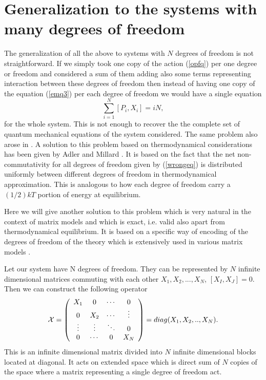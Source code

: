 \documentclass[a4paper,11pt]{article}
\begin{document}
\section{Generalization to the systems with many degrees of
freedom} \label{sec5}

 The generalization of all the above to systems
with $N$ degrees of freedom is not straightforward. If we simply
took one copy of the action (\ref{opfq}) per one degree or freedom
and considered a sum of them adding also some terms representing
interaction between these degrees of freedom then instead of
having one copy of the equation (\ref{emq3}) per each degree of
freedom we would have a single equation
\begin{equation}
\sum\limits_{i=1}^{N} [P_i,X_i]=iN, \label{wrongeq}
\end{equation}
for the whole system. This is not enough to recover the the
complete set of quantum mechanical equations of the system
considered. The same problem also arose in \cite{adlerbook}. A
solution to this problem based on thermodynamical considerations
has been given by Adler and Millard \cite{adlermillard}. It is
based on the fact that the net non-commutativity for all degrees
of freedom given by (\ref{wrongeq}) is distributed uniformly
between different degrees of freedom in thermodynamical
approximation. This is analogous to how each degree of freedom
carry a $(1/2)kT$ portion of energy at equilibrium.

Here we will give another solution to this problem which is very
natural in the context of matrix models and which is exact, i.e.
valid also apart from thermodynamical equilibrium. It is based on
a specific way of encoding of the degrees of freedom of the theory
which is extensively used in various matrix models
\cite{BFSS,IKKT,cmm}.

 Let our system have N degrees of freedom. They can be represented
 by $N$ infinite dimensional matrices commuting with each other
$X_1,X_2,...,X_N$, $[X_I,X_J]=0$. Then we can construct the
following operator
\begin{eqnarray}
{\cal X}= \left(
\begin{array}{cccc}
X_1 & 0 & \cdots & 0 \\
0 & X_2 & \cdots & \vdots \\
\vdots & \vdots & \ddots & 0 \\
0 & \cdots & 0 & X_N
\end{array} \right)=diag(X_1,X_2,..,X_N).
\label{bigx}
\end{eqnarray}
This is an infinite dimensional matrix divided into $N$ infinite
dimensional blocks located at diagonal. It acts on extended space
which is direct sum of $N$ copies of the space where a matrix
representing a single degree of freedom act.
\end{document}

